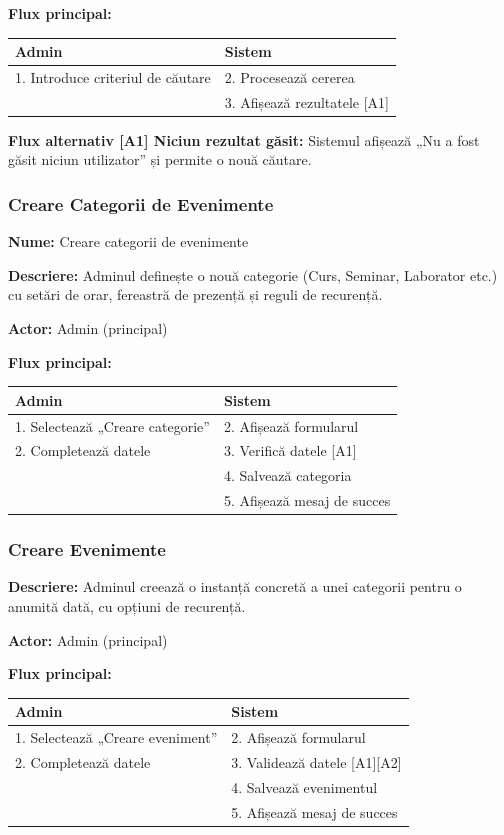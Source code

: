 \documentclass[11pt]{article}
\begin{document}
\textbf{Flux principal:}

\begin{tabular}{l l}
\hline
\textbf{Admin} & \textbf{Sistem} \\
\hline
1. Introduce criteriul de căutare & 2. Procesează cererea \\
 & 3. Afișează rezultatele [A1] \\
\hline
\end{tabular}

\textbf{Flux alternativ [A1] Niciun rezultat găsit:}  \newline
Sistemul afișează „Nu a fost găsit niciun utilizator” și permite o nouă căutare.



\subsubsection{Creare Categorii de Evenimente}

\textbf{Nume:} Creare categorii de evenimente

\textbf{Descriere:} Adminul definește o nouă categorie (Curs, Seminar, Laborator etc.) cu setări de orar, fereastră de prezență și reguli de recurență.

\textbf{Actor:} Admin (principal)

\textbf{Flux principal:}

\begin{tabular}{l l}
\hline
\textbf{Admin} & \textbf{Sistem} \\
\hline
1. Selectează „Creare categorie” & 2. Afișează formularul \\
2. Completează datele & 3. Verifică datele [A1] \\
 & 4. Salvează categoria \\
 & 5. Afișează mesaj de succes \\
\hline
\end{tabular}

\subsubsection{Creare Evenimente}


\textbf{Descriere:} Adminul creează o instanță concretă a unei categorii pentru o anumită dată, cu opțiuni de recurență.

\textbf{Actor:} Admin (principal)

\textbf{Flux principal:}

\begin{tabular}{l l}
\hline
\textbf{Admin} & \textbf{Sistem} \\
\hline
1. Selectează „Creare eveniment” & 2. Afișează formularul \\
2. Completează datele & 3. Validează datele [A1][A2] \\
 & 4. Salvează evenimentul \\
 & 5. Afișează mesaj de succes \\
\hline
\end{tabular}
\end{document}
